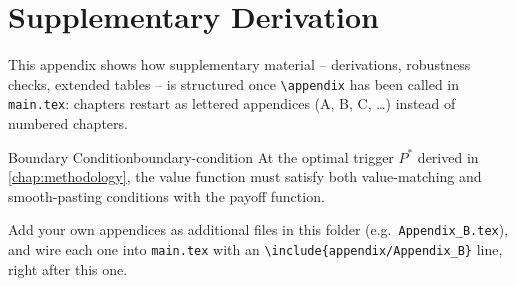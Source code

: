 \chapter{Supplementary Derivation}
\label{app:supplementary}


This appendix shows how supplementary material -- derivations, robustness checks, extended tables -- is structured once \texttt{\textbackslash appendix} has been called in \texttt{main.tex}: chapters restart as lettered appendices (A, B, C, \ldots) instead of numbered chapters.

\begin{theo}{Boundary Condition}{boundary-condition}
\label{theo:boundary-condition}
At the optimal trigger $P^{*}$ derived in \cref{chap:methodology}, the value function must satisfy both value-matching and smooth-pasting conditions with the payoff function.
\end{theo}

Add your own appendices as additional files in this folder (e.g.\ \texttt{Appendix\_B.tex}), and wire each one into \texttt{main.tex} with an \texttt{\textbackslash include\{appendix/Appendix\_B\}} line, right after this one.
